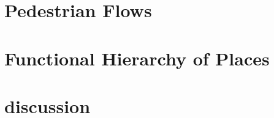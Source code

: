 
\section{Pedestrian Flows}



\section{Functional Hierarchy of Places}






\section{discussion}


